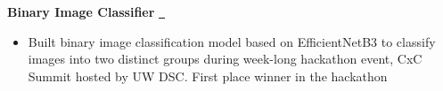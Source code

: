 \textbf{Binary Image Classifier} \href{https://github.com/ininicho/cxc_submission}{\github\ } \par
\begin{itemize}
	\item Built binary image classification model based on EfficientNetB3 to classify images into two distinct groups during week-long hackathon event, CxC Summit hosted by UW DSC. First place winner in the hackathon
\end{itemize}
\vspace{0.1cm} \par
